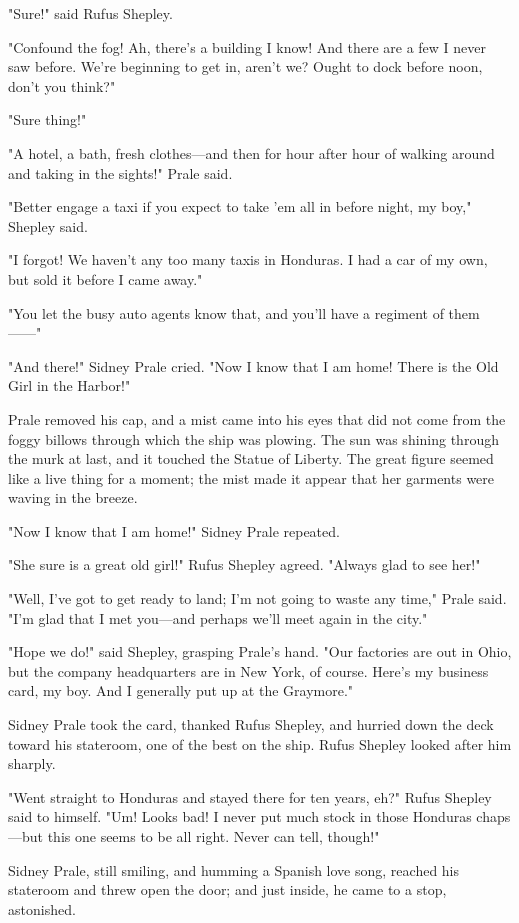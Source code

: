\documentclass{novel}
\begin{document}
"Sure!" said Rufus Shepley.

"Confound the fog! Ah, there's a building I know! And there are a few I never saw before. We're beginning to get in, aren't we? Ought to dock before noon, don't you think?"

"Sure thing!"

"A hotel, a bath, fresh clothes---and then for hour after hour of walking around and taking in the sights!" Prale said.

"Better engage a taxi if you expect to take 'em all in before night, my boy," Shepley said.

"I forgot! We haven't any too many taxis in Honduras. I had a car of my own, but sold it before I came away."

"You let the busy auto agents know that, and you'll have a regiment of them------"

"And there!" Sidney Prale cried. "Now I know that I am home! There is the Old Girl in the Harbor!"

Prale removed his cap, and a mist came into his eyes that did not come from the foggy billows through which the ship was plowing. The sun was shining through the murk at last, and it touched the Statue of Liberty. The great figure seemed like a live thing for a moment; the mist made it appear that her garments were waving in the breeze.

"Now I know that I am home!" Sidney Prale repeated.

"She sure is a great old girl!" Rufus Shepley agreed. "Always glad to see her!"

"Well, I've got to get ready to land; I'm not going to waste any time," Prale said. "I'm glad that I met you---and perhaps we'll meet again in the city."

"Hope we do!" said Shepley, grasping Prale's hand. "Our factories are out in Ohio, but the company headquarters are in New York, of course. Here's my business card, my boy. And I generally put up at the Graymore."

Sidney Prale took the card, thanked Rufus Shepley, and hurried down the deck toward his stateroom, one of the best on the ship. Rufus Shepley looked after him sharply.

"Went straight to Honduras and stayed there for ten years, eh?" Rufus Shepley said to himself. "Um! Looks bad! I never put much stock in those Honduras chaps---but this one seems to be all right. Never can tell, though!"

Sidney Prale, still smiling, and humming a Spanish love song, reached his stateroom and threw open the door; and just inside, he came to a stop, astonished.
\end{document}
